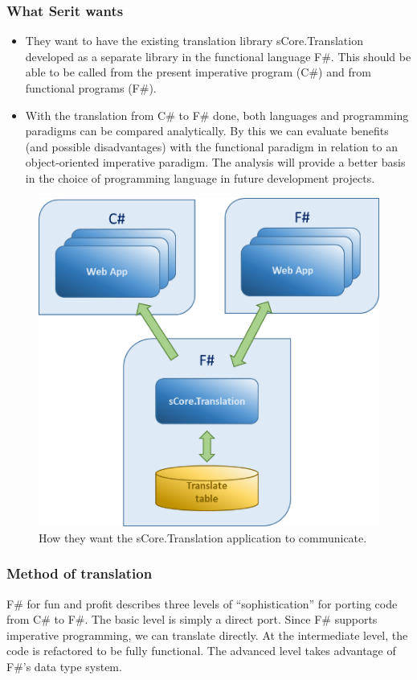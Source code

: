 \documentclass[12pt, a4paper]{article}
\begin{document}
\newpage
\subsubsection{What Serit wants}

\begin{itemize}
	\item They want to have the existing translation library sCore.Translation developed as a separate library in the functional language F\#. This should be able to be called from the present imperative program (C\#) and from functional programs (F\#).
	\item With the translation from C\# to F\# done, both languages and programming paradigms can be compared analytically. By this we can evaluate benefits (and possible disadvantages) with the functional paradigm in relation to an object-oriented imperative paradigm. The analysis will provide a better basis in the choice of programming language in future development projects.
\end{itemize}

\begin{figure}[!h]
    \includegraphics[scale=0.5]{image02}
    \centering
    \caption{How they want the sCore.Translation application to communicate.}
\end{figure}

\newpage
\subsubsection{Method of translation}
F\# for fun and profit describes three levels of “sophistication” for porting code from C\# to F\#. The basic level is simply a direct port. Since F\# supports imperative programming, we can translate directly. At the intermediate level, the code is refactored to be fully functional. The advanced level takes advantage of F\#’s data type system.\\
\end{document}

